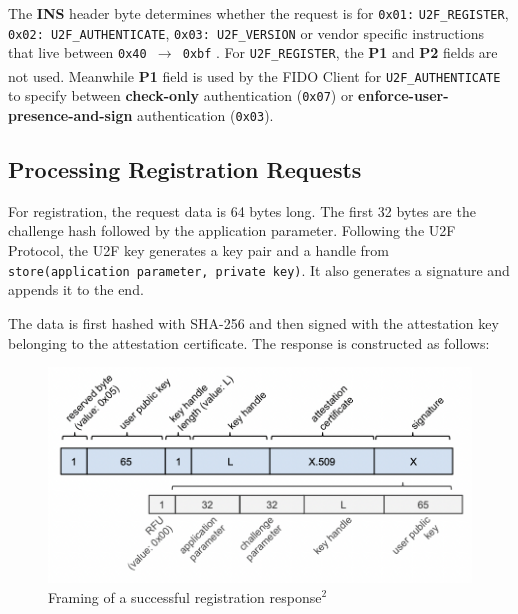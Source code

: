 \documentclass[acmtog,review]{acmart}
\begin{document}
The \textbf{INS} header byte determines whether the request is for \texttt{0x01:} \texttt{U2F\_REGISTER}, \texttt{0x02: U2F\_AUTHENTICATE}, \texttt{0x03: U2F\_VERSION} or vendor specific instructions that live between \texttt{0x40 $\xrightarrow[]{}$ 0xbf}
. 
For \texttt{U2F\_REGISTER}, the \textbf{P1} and \textbf{P2} fields are not used. 
Meanwhile  \textbf{P1} field is used by the FIDO Client for \texttt{U2F\_AUTHENTICATE} to specify between 
\textbf{check-only} authentication (\texttt{0x07}) or \textbf{enforce-user-presence-and-sign} authentication (\texttt{0x03}).
\subsection{Processing Registration Requests}

For registration, the request data is 64 bytes long. The first 32 bytes are the challenge hash followed by the application parameter.
Following the U2F Protocol, the U2F key generates a key pair and a handle from \texttt{store(application parameter, private key)}.
It also generates a signature and appends it to the end.

The data is first hashed with SHA-256 and then signed with the attestation key belonging to the attestation certificate.
The response is constructed as follows: \\

\begin{figure}[H]
    \centering
    \includegraphics[scale=0.5]{regresp}
    \caption{Framing of a successful registration response$^2$}
\end{figure}

\addtocounter{footnote}{1}
\end{document}
